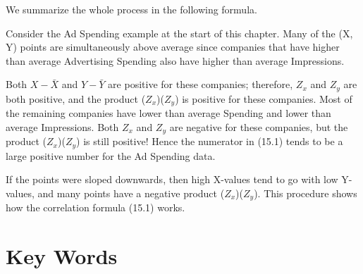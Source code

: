 \documentclass[11pt, chapterprefix=true]{scrbook}\usepackage[]{graphicx}\usepackage[]{color}
\begin{document}
We summarize the whole process in the following formula. 

\begin{center}
\end{center}

Consider the Ad Spending example at the start of this chapter.  Many of the (X, Y) points are simultaneously above average since companies that have higher than average Advertising Spending also have higher than average Impressions.  

Both $X - \bar{X}$  and $Y - \bar{Y}$ are positive for these companies; therefore, $Z_x$  and $Z_y$  are both positive, and the product ($Z_x$)($Z_y$)  is positive for these companies.  Most of the remaining companies have lower than average Spending and lower than average Impressions.  Both $Z_x$  and $Z_y$  are negative for these companies, but the product ($Z_x$)($Z_y$) is still positive!  Hence the numerator in (15.1) tends to be a large positive number for the Ad Spending data.

If the points were sloped downwards, then high X-values tend to go with low Y-values, and many points have a negative product ($Z_x$)($Z_y$).  This procedure shows how the correlation formula (15.1) works.  



\section{Key Words}

\end{document}
